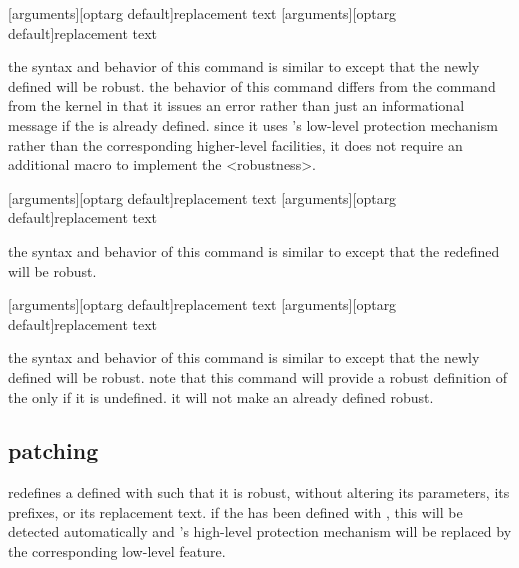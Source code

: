 \begin{ltxsyntax}

[arguments][optarg default]{replacement text}
[arguments][optarg default]{replacement text}

the syntax and behavior of this command is similar to  except that the newly defined  will be robust. the behavior of this command differs from the  command from the \latex kernel in that it issues an error rather than just an informational message if the  is already defined. since it uses \etex's low-level protection mechanism rather than the corresponding higher-level \latex facilities, it does not require an additional macro to implement the <robustness>.

[arguments][optarg default]{replacement text}
[arguments][optarg default]{replacement text}

the syntax and behavior of this command is similar to  except that the redefined  will be robust.

[arguments][optarg default]{replacement text}
[arguments][optarg default]{replacement text}

the syntax and behavior of this command is similar to  except that the newly defined  will be robust. note that this command will provide a robust definition of the  only if it is undefined. it will not make an already defined  robust.

\end{ltxsyntax}

\subsection{patching}
\label{use:pat}

\begin{ltxsyntax}


redefines a  defined with  such that it is robust, without altering its parameters, its prefixes, or its replacement text. if the  has been defined with , this will be detected automatically and \latex's high-level protection mechanism will be replaced by the corresponding low-level \etex feature.

\end{ltxsyntax}

